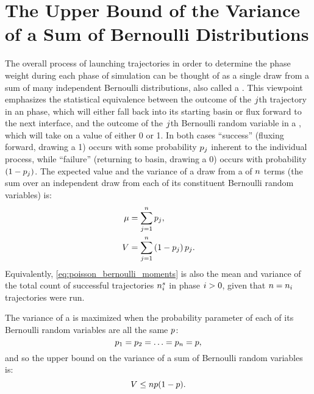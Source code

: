 %
%
%
%

\section{The Upper Bound of the Variance of a Sum of Bernoulli Distributions}
\label{sec:bernoulli_mixture_var}
The overall process of launching trajectories in order to determine the phase weight during each phase of  simulation can be thought of as a single draw from a sum of many independent Bernoulli distributions, also called a . This viewpoint emphasizes the statistical equivalence between the outcome of the $j$th trajectory in an  phase, which will either fall back into its starting basin or flux forward to the next interface, and the outcome of the $j$th Bernoulli random variable in a , which will take on a value of either 0 or 1. In both cases ``success'' (fluxing forward, drawing a 1) occurs with some probability $p_{j}$ inherent to the individual process, while ``failure'' (returning to basin, drawing a 0) occurs with probability $(1 - p_{j})$. The expected value and the variance of a draw from a  of $n$ terms (\ie the sum over an independent draw from each of its constituent Bernoulli random variables) is:
    \begin{align}
    \label{eq:poisson_bernoulli_moments}
        \begin{split}
            \mu &= \sum _{j=1}^{n} p_{j}, \\
            V &= \sum _{j=1}^{n} \left( 1 - p_{j} \right) p_{j}.
        \end{split}
    \end{align}
Equivalently, \eqref{eq:poisson_bernoulli_moments} is also the mean and variance of the total count of successful trajectories $n_{i}^{s}$ in  phase $i>0$, given that $n = n_{i}$ trajectories were run.

The variance of a  is maximized when the probability parameter of each of its Bernoulli random variables are all the same $p$:
    \begin{equation*}
        p_{1} = p_{2} = \ldots = p_{n} = p,
    \end{equation*}
and so the upper bound on the variance of a sum of Bernoulli random variables is:
    \begin{equation}
    \label{eq:bernoulli_mixture_variance_max}
        V \leq n p(1 - p).
    \end{equation}

